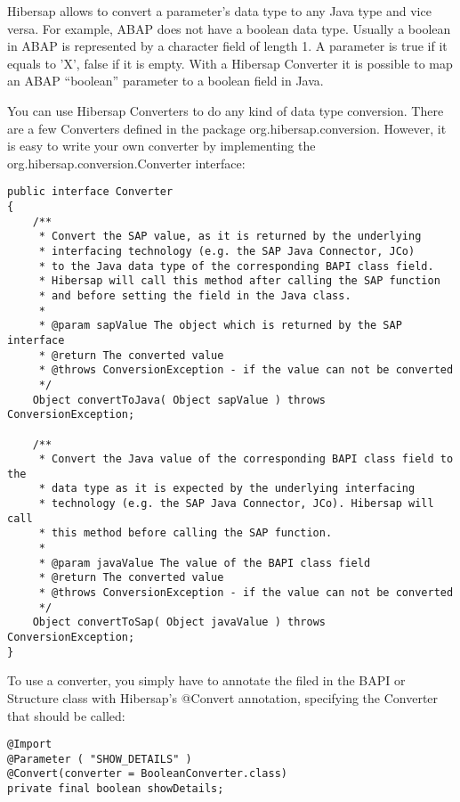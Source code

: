 Hibersap allows to convert a parameter's data type to any Java type and vice versa. For example, ABAP does not have a boolean data type. Usually a boolean in ABAP is represented by a character field of length 1. A parameter is true if it equals to 'X', false if it is empty. With a Hibersap Converter it is possible to map an ABAP ``boolean'' parameter to a boolean field in Java.

You can use Hibersap Converters to do any kind of data type conversion. There are a few Converters defined in the package org.hibersap.conversion. However, it is easy to write your own converter by implementing the org.hibersap.conversion.Converter interface:

\begin{lstlisting}[caption=The Converter interface]
public interface Converter
{
    /**
     * Convert the SAP value, as it is returned by the underlying 
     * interfacing technology (e.g. the SAP Java Connector, JCo) 
     * to the Java data type of the corresponding BAPI class field. 
     * Hibersap will call this method after calling the SAP function
     * and before setting the field in the Java class.
     * 
     * @param sapValue The object which is returned by the SAP interface
     * @return The converted value
     * @throws ConversionException - if the value can not be converted
     */
    Object convertToJava( Object sapValue ) throws ConversionException;

    /**
     * Convert the Java value of the corresponding BAPI class field to the 
     * data type as it is expected by the underlying interfacing 
     * technology (e.g. the SAP Java Connector, JCo). Hibersap will call 
     * this method before calling the SAP function.
     * 
     * @param javaValue The value of the BAPI class field
     * @return The converted value
     * @throws ConversionException - if the value can not be converted
     */
    Object convertToSap( Object javaValue ) throws ConversionException;
}
\end{lstlisting}

To use a converter, you simply have to annotate the filed in the BAPI or Structure class with Hibersap's @Convert annotation, specifying the Converter that should be called:

\begin{lstlisting}[caption=Using a converter]
@Import
@Parameter ( "SHOW_DETAILS" )
@Convert(converter = BooleanConverter.class)
private	final boolean showDetails;
\end{lstlisting}

